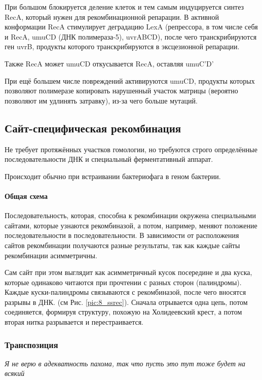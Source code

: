 При большом блокируется деление клеток и тем самым индуцируется синтез RecA, который нужен для рекомбинационной репарации. В активной конформации RecA стимулирует деградацию LexA (репрессора, в том числе себя и RecA, umuCD (ДНК полимераза-5), uvrABCD), после чего транскрибируются ген uvrB, продукты которого транскрибируются в эксцезионной репарации. 

Также RecA может umuCD откусывается RecA, оставляя umuC'D'

При ещё большем числе повреждений активируются umuCD, продукты которых позволяют полимеразе копировать нарушенный участок матрицы (вероятно позволяют им удлинять затравку), из-за чего больше мутаций. 
\subsection{Сайт-специфическая рекомбинация}
Не требует протяжённых участков гомологии, но требуются строго определённые последовательности ДНК и специальный ферментативный аппарат.

Происходит обычно при встраивании бактериофага в геном бактерии. 

\paragraph{Общая схема} Последовательность, которая,  способна к рекомбинации окружена специальными сайтами, которые узнаются рекомбиназой, а потом, например, меняют положение последовательности в последовательности. В зависимости от расположения сайтов рекомбинации получаются разные результаты, так как каждые сайты рекомбинации асимметричны.

Сам сайт при этом выглядит как асимметричный кусок посередине и два куска, которые одинаково читаются при прочтении с разных сторон (палиндромы). Каждые куски-палиндромы связываются с рекомбиназой, после чего вносятся разрывы в ДНК. (см Рис. \ref{pic:8_ssrec}). Сначала отрывается одна цепь, потом соединяется, формируя структуру, похожую на Холидеевский крест, а потом вторая нитка разрывается и перестраивается. 
 \begin{figure}[H]
\end{figure}
\subsubsection{Транспозиция}
\textit{Я не верю в адекватность пахома, так что пусть это тут тоже будет на всякий}

